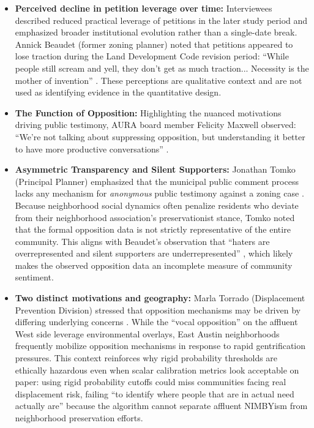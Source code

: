 \documentclass[11pt, letterpaper, oneside]{article}
\begin{document}
\begin{itemize}
    \item \textbf{Perceived decline in petition leverage over time:} Interviewees described reduced practical leverage of petitions in the later study period and emphasized broader institutional evolution rather than a single-date break. Annick Beaudet (former zoning planner) noted that petitions appeared to lose traction during the Land Development Code revision period: ``While people still scream and yell, they don't get as much traction... Necessity is the mother of invention'' \cite{interview_beaudet2025,cityaustin2017codenext}. These perceptions are qualitative context and are not used as identifying evidence in the quantitative design.

    \item \textbf{The Function of Opposition:} Highlighting the nuanced motivations driving public testimony, AURA board member Felicity Maxwell observed: ``We're not talking about suppressing opposition, but understanding it better to have more productive conversations'' \cite{interview_maxwell2026}.
    \item \textbf{Asymmetric Transparency and Silent Supporters:} Jonathan Tomko (Principal Planner) emphasized that the municipal public comment process lacks any mechanism for \textit{anonymous} public testimony against a zoning case \cite{interview_tomko2026}. Because neighborhood social dynamics often penalize residents who deviate from their neighborhood association's preservationist stance, Tomko noted that the formal opposition data is not strictly representative of the entire community. This aligns with Beaudet's observation that ``haters are overrepresented and silent supporters are underrepresented'' \cite{interview_beaudet2025}, which likely makes the observed opposition data an incomplete measure of community sentiment.
    \item \textbf{Two distinct motivations and geography:} Marla Torrado (Displacement Prevention Division) stressed that opposition mechanisms may be driven by differing underlying concerns \cite{interview_marla2025}. While the ``vocal opposition'' on the affluent West side leverage environmental overlays, East Austin neighborhoods frequently mobilize opposition mechanisms in response to rapid gentrification pressures. This context reinforces why rigid probability thresholds are ethically hazardous even when scalar calibration metrics look acceptable on paper: using rigid probability cutoffs could miss communities facing real displacement risk, failing ``to identify where people that are in actual need actually are'' because the algorithm cannot separate affluent NIMBYism from neighborhood preservation efforts.
\end{itemize}
\end{document}
